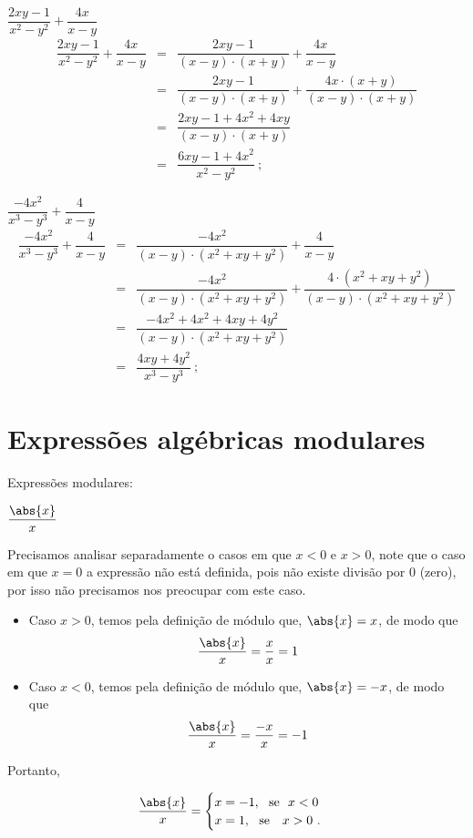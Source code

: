  \begin{exem}
  $\dfrac{2xy-1}{x^2 - y^2} + \dfrac{4x}{x-y}$
  \begin{eqnarray*}
   \dfrac{2xy-1}{x^2 - y^2} + \dfrac{4x}{x-y} &=& \dfrac{2xy-1}{(x-y)\cdot (x+y)} + \dfrac{4x}{x-y} \\
   &=& \dfrac{2xy-1}{(x-y)\cdot (x+y)} + \dfrac{4x \cdot (x+y)}{(x-y)\cdot (x+y)} \\
   &=& \dfrac{2xy - 1 + 4x^2 + 4xy}{(x-y)\cdot (x+y)} \\
   &=& \dfrac{6xy - 1 + 4x^2}{x^2 - y^2} \ ;
  \end{eqnarray*}
  \end{exem}
 
 \begin{exem}
  $\dfrac{-4x^2}{x^3 - y^3} + \dfrac{4}{x-y}$
  \begin{eqnarray*}
   \dfrac{-4x^2}{x^3 - y^3} + \dfrac{4}{x-y} & = & \dfrac{-4x^2}{(x-y)\cdot (x^2+xy+y^2)} + \dfrac{4}{x-y} \\
   &=& \dfrac{-4x^2}{(x-y)\cdot (x^2+xy+y^2)} + \dfrac{4 \cdot (x^2+xy+y^2)}{(x-y)\cdot (x^2+xy+y^2)} \\
   &=& \dfrac{-4x^2 + 4x^2 + 4xy + 4y^2}{(x-y) \cdot (x^2+xy+y^2)} \\
   &=& \dfrac{4xy + 4y^2}{x^3 - y^3}  \ ;
  \end{eqnarray*}
  \end{exem}
 

 
 \section{Expressões algébricas modulares}
 
 Expressões modulares:

 \begin{exem}
  $\dfrac{\abs{x}}{x}$

  Precisamos analisar separadamente o casos em que $x<0$ e $x>0$, note que o caso em que $x=0$ a expressão não está definida, pois não existe divisão por $0$ (zero), por isso não precisamos nos preocupar com este caso.

  \begin{itemize}
   \item Caso $x> 0$, temos pela definição de módulo que, $\abs{x}= x$, de modo que
\begin{equation}
\dfrac{\abs{x}}{x}=\dfrac{x}{x}= 1
\end{equation}
   \item Caso $x< 0$, temos pela definição de módulo que, $\abs{x}= -x$, de modo que
\begin{equation}
\dfrac{\abs{x}}{x}=\dfrac{-x}{x}= -1
\end{equation}
  \end{itemize}

 Portanto,

  \[ \frac{\abs{x}}{x} = \begin{cases}
      x= -1, \ \ \text{se} \ \ x< 0 \\
      x= 1, \ \ \text{se } \ \ x> 0 \ .
     \end{cases}
  \]
\end{exem}
 
